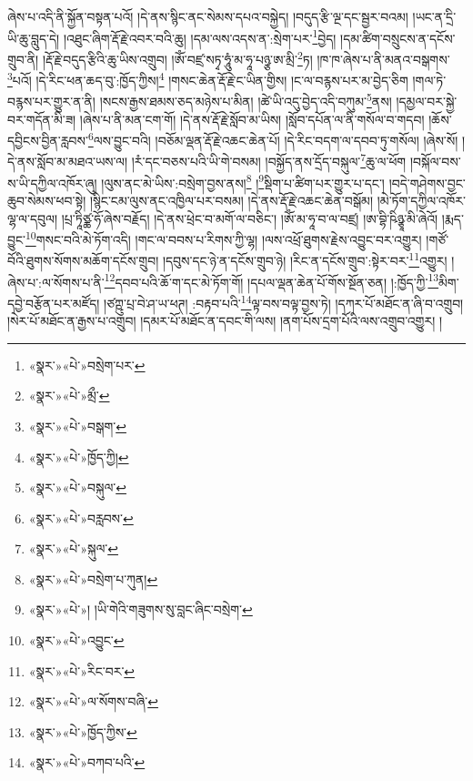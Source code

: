 ཞེས་པ་འདི་ནི་སྐྱོན་བསྟན་པའོ། །དེ་ནས་སྙིང་ནང་སེམས་དཔའ་བསྐྱེད། །བདུད་རྩི་ལྔ་དང་སྦྱར་བའམ། །ཡང་ན་དྲི་ཡི་ཆུ་བླུད་དེ། །འཐུང་ཞིག་རྡོ་རྗེ་འབར་བའི་ཆུ། །དམ་ལས་འདས་ན་:སྲེག་པར་\footnote{«སྣར་»«པེ་»བསྲེག་པར་}བྱེད། །དམ་ཚིག་བསྲུངས་ན་དངོས་གྲུབ་ནི། །རྡོ་རྗེ་བདུད་རྩིའི་ཆུ་ཡིས་འགྲུབ། །ཨོཾ་བཛྲ་སཏྭ་ཧཱུཾ་མ་ཧཱ་པཉྩ་ཨ་མྲི་\footnote{«སྣར་»«པེ་»མྲྀ་}ཏ། །ཁ་ཁ་ཞེས་པ་ནི་མནའ་བསྒགས་\footnote{«སྣར་»«པེ་»བསྒག་}པའོ། །དེ་རིང་ཕན་ཆད་བུ་:ཁྱོད་ཀྱིས།\footnote{«སྣར་»«པེ་»ཁྱོད་ཀྱི།} །གསང་ཆེན་རྡོ་རྗེ་ང་ཡིན་གྱིས། །ང་ལ་བརྙས་པར་མ་བྱེད་ཅིག །གལ་ཏེ་བརྙས་པར་གྱུར་ན་ནི། །སངས་རྒྱས་ཐམས་ཅད་མཉེས་པ་མིན། །ཚེ་ཡི་འདུ་བྱེད་འདི་བཀུམ་\footnote{«སྣར་»«པེ་»བསྐུལ་}ནས། །དམྱལ་བར་སྐྱེ་བར་གདོན་མི་ཟ། །ཞེས་པ་ནི་མན་ངག་གོ། །དེ་ནས་རྡོ་རྗེ་སློབ་མ་ཡིས། །སློབ་དཔོན་ལ་ནི་གསོལ་བ་གདབ། །ཆོས་དབྱིངས་བྱིན་རླབས་\footnote{«སྣར་»«པེ་»བརླབས་}ལས་བྱུང་བའི། །བཅོམ་ལྡན་རྡོ་རྗེ་འཆང་ཆེན་པོ། །དེ་རིང་བདག་ལ་དབབ་ཏུ་གསོལ། །ཞེས་སོ། །དེ་ནས་སློབ་མ་མཐའ་ཡས་ལ། །རཾ་དང་བཅས་པའི་ཡི་གེ་བསམ། །བསྐྱོད་ནས་དྲོད་བསྐུལ་\footnote{«སྣར་»«པེ་»སྐུལ་}ཆུ་ལ་ཕོག །བསྐོལ་བས་ས་ཡི་དཀྱིལ་འཁོར་ཞུ། །ལུས་ནང་མེ་ཡིས་:བསྲེག་བྱས་ནས།\footnote{«སྣར་»«པེ་»བསྲེག་པ་ཀུན།} །\footnote{«སྣར་»«པེ་»། །ཡི་གེའི་གཟུགས་སུ་བླང་ཞིང་བསྲེག་}སྡིག་པ་ཚིག་པར་གྱུར་པ་དང་། །བདེ་གཤེགས་བྱང་ཆུབ་སེམས་ཕབ་སྟེ། །སྙིང་ངམ་ལུས་ནང་འཁྱིལ་པར་བསམ། །དེ་ནས་རྡོ་རྗེ་འཆང་ཆེན་བསྒོམ། །མེ་ཏོག་དཀྱིལ་འཁོར་ལྷ་ལ་དབུལ། །པྲ་ཏཱིཙྪ་ཧོ་ཞེས་བརྗོད། །དེ་ནས་ཕྲེང་བ་མགོ་ལ་བཅིང་། །ཨོཾ་མ་ཧཱ་བ་ལ་བཛྲ། །ཨ་བྷི་ཥིཉྩཱ་མི་ཞེའོ། །རྨད་བྱུང་\footnote{«སྣར་»«པེ་»འབྱུང་}གསང་བའི་མེ་ཏོག་འདི། །གང་ལ་བབས་པ་རིགས་ཀྱི་ལྷ། །ལས་འཕྲོ་ཐུགས་རྗེས་འབྱུང་བར་འགྱུར། །གཙོ་བོའི་ཐུགས་སོགས་མཆོག་དངོས་གྲུབ། །དབུས་དང་ཉེ་ན་དངོས་གྲུབ་ཉེ། །རིང་ན་དངོས་གྲུབ་:སྟེར་བར་\footnote{«སྣར་»«པེ་»རིང་བར་}འགྱུར། །ཞེས་པ་:ལ་སོགས་པ་ནི་\footnote{«སྣར་»«པེ་»ལ་སོགས་བཞི་}དབབ་པའི་ཆོ་ག་དང་མེ་ཏོག་གོ། །དཔལ་ལྡན་ཆེན་པོ་གོས་སྔོན་ཅན། །:ཁྱོད་ཀྱི་\footnote{«སྣར་»«པེ་»ཁྱོད་ཀྱིས་}མིག་དབྱེ་བརྩོན་པར་མཛོད། །ཙཀྵུ་པྲ་བེ་ཤ་ཡ་ཕཊ། :བརྟབ་པའི་\footnote{«སྣར་»«པེ་»བཀབ་པའི་}ལྟ་བས་བལྟ་བྱས་ཏེ། །དཀར་པོ་མཐོང་ན་ཞི་བ་འགྲུབ། །སེར་པོ་མཐོང་ན་རྒྱས་པ་འགྲུབ། །དམར་པོ་མཐོང་ན་དབང་གི་ལས། །ནག་པོས་དྲག་པོའི་ལས་འགྲུབ་འགྱུར། །
